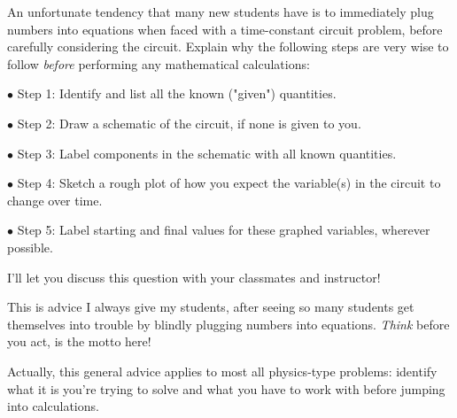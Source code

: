 

An unfortunate tendency that many new students have is to immediately plug numbers into equations when faced with a time-constant circuit problem, before carefully considering the circuit.  Explain why the following steps are very wise to follow {\it before} performing any mathematical calculations:

\medskip
\item{$\bullet$} Step 1: Identify and list all the known ("given") quantities.
\item{$\bullet$} Step 2: Draw a schematic of the circuit, if none is given to you.
\item{$\bullet$} Step 3: Label components in the schematic with all known quantities. 
\item{$\bullet$} Step 4: Sketch a rough plot of how you expect the variable(s) in the circuit to change over time.
\item{$\bullet$} Step 5: Label starting and final values for these graphed variables, wherever possible.
\medskip







I'll let you discuss this question with your classmates and instructor!







This is advice I always give my students, after seeing so many students get themselves into trouble by blindly plugging numbers into equations.  {\it Think} before you act, is the motto here!

Actually, this general advice applies to most all physics-type problems: identify what it is you're trying to solve and what you have to work with before jumping into calculations.





